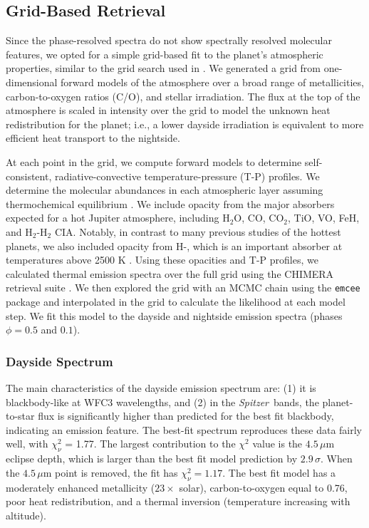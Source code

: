 \documentclass[twocolumn]{aastex61}
\newcommand{\project}[1]{\textsl{#1}}
\newcommand{\Spitzer}{\project{Spitzer}}
\begin{document}
\subsection{Grid-Based Retrieval}
\label{sec:retrieval}
Since the phase-resolved spectra do not show spectrally resolved molecular features, we opted for a simple grid-based fit to the planet's atmospheric properties, similar to the grid search used in \cite{arcangeli18, mansfield18}. We generated a grid from one-dimensional forward models of the atmosphere over a broad range of metallicities, carbon-to-oxygen ratios (C/O), and stellar irradiation. The flux at the top of the atmosphere is scaled in intensity over the grid to model the unknown heat redistribution for the planet; i.e., a lower dayside irradiation is equivalent to more efficient heat transport to the nightside. 

At each point in the grid, we compute forward models to determine self-consistent, radiative-convective temperature-pressure (T-P) profiles. We determine the molecular abundances in each atmospheric layer assuming thermochemical equilibrium \citep[calculated with the NASA CEA routine;][]{gordon94}.  We include opacity from the major absorbers expected for a hot Jupiter atmosphere, including H$_2$O, CO, CO$_2$, TiO, VO, FeH, and H$_2$-H$_2$ CIA. Notably, in contrast to many previous studies of the hottest planets, we also included opacity from H-, which is an important absorber at temperatures above 2500 K \citep{arcangeli18}.  Using these opacities and T-P profiles, we calculated thermal emission spectra over the full grid using the CHIMERA retrieval suite \citep[described in][]{line13a, line14}.  We then explored the grid with an MCMC chain using the \texttt{emcee} package \citep{foremanmackey13} and interpolated in the grid to calculate the likelihood at each model step. We fit this model to the dayside and nightside emission spectra (phases $\phi = 0.5$ and $0.1$). 

\subsubsection{Dayside Spectrum}
The main characteristics of the dayside emission spectrum are: (1) it is blackbody-like at WFC3 wavelengths, and (2) in the \Spitzer\ bands, the planet-to-star flux is significantly higher than predicted for the best fit blackbody, indicating an emission feature.  The best-fit spectrum reproduces these data fairly well, with $\chi^2_\nu$ = 1.77. The largest contribution to the $\chi^2$ value is the $4.5\,\mu$m eclipse depth, which is larger than the best fit model prediction by $2.9\,\sigma$. When the $4.5\,\mu$m point is removed, the fit has $\chi^2_\nu = 1.17$.  The best fit model has a moderately enhanced metallicity ($23\times$ solar), carbon-to-oxygen equal to 0.76, poor heat redistribution, and a thermal inversion (temperature increasing with altitude).
\end{document}
